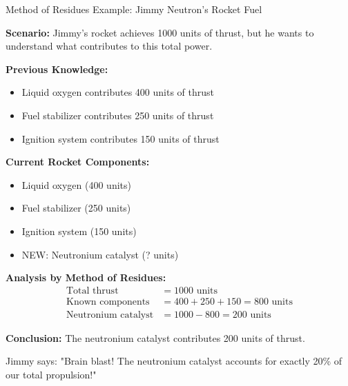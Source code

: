 \documentclass{beamer}
\begin{document}
\begin{frame}{Method of Residues Example: Jimmy Neutron's Rocket Fuel}
	\scriptsize{
	\textbf{Scenario:} Jimmy's rocket achieves 1000 units of thrust, but he wants to understand what contributes to this total power.
	

	\textbf{Previous Knowledge:}
	\begin{itemize}
		\item Liquid oxygen contributes 400 units of thrust
		\item Fuel stabilizer contributes 250 units of thrust
		\item Ignition system contributes 150 units of thrust
	\end{itemize}
	
	\textbf{Current Rocket Components:}
	\begin{itemize}
		\item Liquid oxygen (400 units)
		\item Fuel stabilizer (250 units)  
		\item Ignition system (150 units)
		\item NEW: Neutronium catalyst (? units)
	\end{itemize}
	
	\textbf{Analysis by Method of Residues:}
	\begin{align}
		\text{Total thrust} &= 1000 \text{ units} \\
		\text{Known components} &= 400 + 250 + 150 = 800 \text{ units} \\
		\text{Neutronium catalyst} &= 1000 - 800 = 200 \text{ units}
	\end{align}
}
	\textbf{Conclusion:} The neutronium catalyst contributes 200 units of thrust.
	
	\begin{block}{Jimmy says:}
		"Brain blast! The neutronium catalyst accounts for exactly 20\% of our total propulsion!"
	\end{block}
\end{frame}
\end{document}
